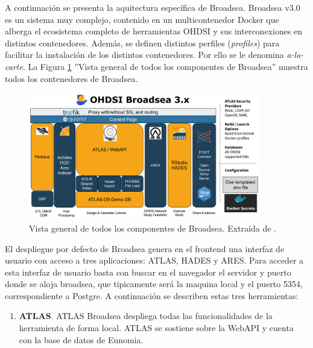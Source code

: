 {%

A continuación se presenta la aquitectura específica de Broadsea. Broadsea v3.0 es un sistema muy complejo, contenido en un multicontenedor Docker que alberga el ecosistema completo de herramientas OHDSI y sus interconexiones en distintos contenedores. Además, se definen distintos perfiles (\textit{profiles}) para facilitar la instalación de los distintos contenedores. Por ello se le denomina \textit{a-la-carte}. La Figura \ref{fig:OHDSIBroadsea3.0} ''Vista general de todos los componentes de Broadsea'' muestra todos los contenedores de Broadsea.

\begin{figure}[H]
    \centering
    \includegraphics[width=0.90\textwidth]{figures/OHDSIBroadsea3.0.png}
    \caption{Vista general de todos los componentes de Broadsea. Extraída de \cite{Broadsea3PPTX}.}
    \label{fig:OHDSIBroadsea3.0}
\end{figure}

El despliegue por defecto de Broadsea genera en el frontend una interfaz de usuario con acceso a tres aplicaciones: ATLAS, HADES y ARES. Para acceder a esta interfaz de usuario basta con buscar en el navegador el servidor y puerto donde se aloja broadsea, que tipicamente será la maquina local y el puerto 5354, correspondiente a Postgre. A continuación se describen estas tres herramientas:

\begin{enumerate}

    \item \textbf{ATLAS}. ATLAS Broadsea despliega todas las funcionalidades de la herramienta de forma local. ATLAS se sostiene sobre la WebAPI y cuenta con la base de datos de Eunomia.
    

\end{enumerate}}

